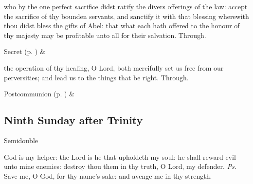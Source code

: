 
\secret
{} who by the one perfect sacrifice didst ratify the divers offerings of the law: accept the sacrifice of thy bounden servants, and sanctify it with that blessing wherewith thou didst bless the gifts of Abel: that what each hath offered to the honour of thy majesty may be profitable unto all for their salvation. Through.
\begin{rubric}
     Secret  (p. \pageref{SPSaints}) \&  
\end{rubric}


\postcommunion
{} the operation of thy healing, O Lord, both mercifully set us free from our perversities; and lead us to the things that be right. Through.


\begin{rubric}
     Postcommunion  (p. \pageref{SPSaints}) \&  
\end{rubric}


\clearpage
\subsection{Ninth Sunday after Trinity}

\vspace{-0.25\baselineskip}

\begin{inhead}
{Semidouble}
\end{inhead}


\vspace{-0.55\baselineskip}

\introit

\vspace{-0.15\baselineskip}

 God is my helper: the Lord is he that upholdeth my soul: he shall reward evil unto mine enemies: destroy thou them in thy truth, O Lord, my defender. \textit{Ps.} Save me, O God, for thy name's sake: and avenge me in thy strength.

